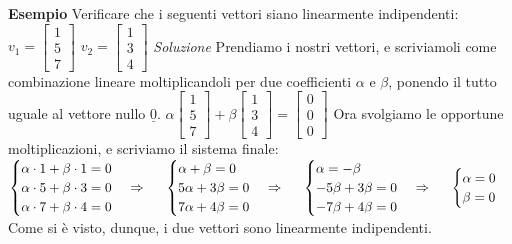 \documentclass[12pt,a4paper,oneside]{book}
\begin{document}
\begin{enumerate}
	  \textbf{Esempio} \linebreak
	  Verificare che i seguenti vettori siano linearmente indipendenti: \linebreak
	  $v_1 = \begin{bmatrix}1\\5\\7\end{bmatrix}$ \hspace{1cm} $v_2 = \begin{bmatrix}1\\3\\4\end{bmatrix}
	  $ \hfill \break
	  \linebreak
	  \linebreak
	  \textit{Soluzione} \linebreak
	  Prendiamo i nostri vettori, e scriviamoli come combinazione lineare moltiplicandoli per due
	  coefficienti $\alpha$ e $\beta$, ponendo il tutto uguale al vettore nullo $\underline{0}$.
	  \linebreak \break
	  $\alpha \begin{bmatrix}1\\5\\7\end{bmatrix} + \beta \begin{bmatrix}1\\3\\4\end{bmatrix} =
	  \begin{bmatrix} 0\\0\\0\end{bmatrix}$ \hfill \break \break
	  Ora svolgiamo le opportune moltiplicazioni, e scriviamo il sistema finale: \linebreak \break
	  $\begin{cases}\alpha\cdot 1+\beta\cdot 1 = 0\\ \alpha\cdot 5 + \beta\cdot 3 = 0 \\ \alpha\cdot 7 +
	  \beta\cdot 4 =0 \end{cases} \Rightarrow \hspace{0.5cm}\begin{cases}\alpha+\beta = 0\\ 5\alpha + 
	  3\beta = 0 \\ 7\alpha + 4\beta =0 \end{cases} \Rightarrow \hspace{0.5cm} \begin{cases}\alpha=-\beta
	  \\ -5\beta + 3\beta = 0 \\ -7\beta + 4\beta =0 \end{cases} \Rightarrow \hspace{0.5cm} \begin{cases}
	  \alpha =0 \\ \beta=0 \end{cases}$ \hfill \break \break
	  Come si è visto, dunque, i due vettori sono linearmente indipendenti.
	
\end{enumerate}
\end{document}
